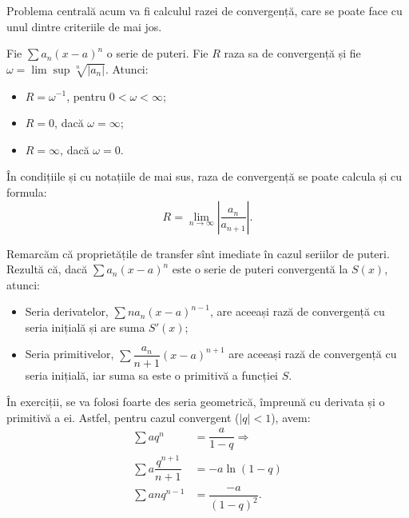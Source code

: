 Problema centrală acum va fi calculul razei de convergență, care se poate
face cu unul dintre criteriile de mai jos.

\begin{theorem}\label{thm:cauchy-had}
  Fie $ \sum a_n (x - a)^n $ o serie de puteri. Fie $ R $ raza sa de convergență
  și fie $ \omega = \lim\sup \sqrt[n]{|a_n|} $. Atunci:
  \begin{itemize}
  \item $ R = \omega^{-1} $, pentru $ 0 < \omega < \infty $;
  \item $ R = 0 $, dacă $ \omega = \infty $;
  \item $ R = \infty $, dacă $ \omega = 0 $.
  \end{itemize}
\end{theorem}

\begin{theorem}\label{thm:raza-conv}
  În condițiile și cu notațiile de mai sus, raza de convergență se poate calcula și 
  cu formula:
  \[
    R = \lim_{n \to \infty} \left| \dfrac{a_n}{a_{n+1}} \right|.
  \]
\end{theorem}

\begin{remark}\label{rk:transfer-serii-puteri}
  Remarcăm că proprietățile de transfer sînt imediate în cazul seriilor de puteri.
  Rezultă că, dacă $ \sum a_n (x - a)^n $ este o serie de puteri convergentă la
  $ S(x) $, atunci:
  \begin{itemize}
  \item Seria derivatelor, $ \sum n a_n(x - a)^{n-1} $, are aceeași rază de
    convergență cu seria inițială și are suma $ S'(x) $;
  \item Seria primitivelor, $ \sum \dfrac{a_n}{n+1} (x - a)^{n+1} $ are
    aceeași rază de convergență cu seria inițială, iar suma sa este
    o primitivă a funcției $ S $.
  \end{itemize}
\end{remark}

În exerciții, se va folosi foarte des seria geometrică, împreună cu derivata
și o primitivă a ei. Astfel, pentru cazul convergent ($ | q | < 1 $), avem:
\begin{align*}
  \sum aq^n &= \dfrac{a}{1 - q} \Rightarrow\\
  \sum a\dfrac{q^{n + 1}}{n + 1} &= -a\ln(1 - q) \\
  \sum anq^{n-1} &= \dfrac{-a}{(1 - q)^2}.
\end{align*}



